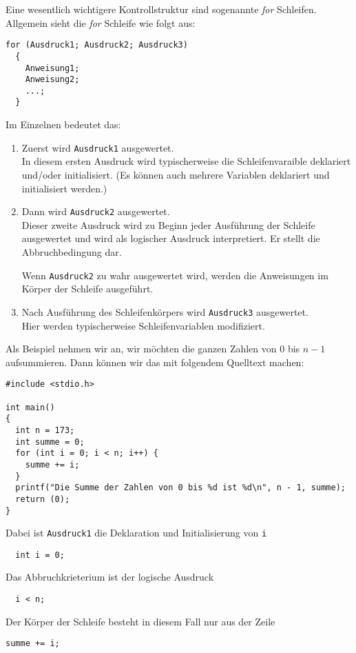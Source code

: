 Eine wesentlich wichtigere Kontrollstruktur sind sogenannte \emph{for} Schleifen.
Allgemein sieht die \emph{for} Schleife wie folgt aus:
\begin{lstlisting}[caption={for Schleife}, belowcaptionskip=0.3em]
for (Ausdruck1; Ausdruck2; Ausdruck3)
  {
    Anweisung1;
    Anweisung2;
    ...;
  }
\end{lstlisting}
Im Einzelnen bedeutet das:
\begin{enumerate}
\item Zuerst wird \texttt{Ausdruck1} ausgewertet.\\
  In diesem ersten Ausdruck wird typischerweise die Schleifenvaraible deklariert und/oder initialisiert.
  (Es können auch mehrere Variablen deklariert und initialisiert werden.)
\item Dann wird \texttt{Ausdruck2} ausgewertet.\\
  Dieser zweite Ausdruck wird zu Beginn jeder Ausführung der Schleife ausgewertet und wird als logischer Ausdruck interpretiert.
  Er stellt die Abbruchbedingung dar.

  Wenn \texttt{Ausdruck2} zu wahr ausgewertet wird, werden die Anweisungen im Körper der Schleife ausgeführt. 
\item Nach Ausführung des Schleifenkörpers wird \texttt{Ausdruck3} ausgewertet.\\
  Hier werden typischerweise Schleifenvariablen modifiziert.
\end{enumerate}
Als Beispiel nehmen wir an, wir möchten die ganzen Zahlen von $0$ bis $n-1$ aufsummieren.
Dann können wir das mit folgendem Quelltext machen:
\begin{lstlisting}
#include <stdio.h>

int main()
{
  int n = 173;
  int summe = 0;
  for (int i = 0; i < n; i++) {
    summe += i;
  }
  printf("Die Summe der Zahlen von 0 bis %d ist %d\n", n - 1, summe);
  return (0);
}
\end{lstlisting}
Dabei ist \texttt{Ausdruck1} die Deklaration und Initialisierung von \verb|i|
\begin{lstlisting}
  int i = 0;
\end{lstlisting}
Das Abbruchkrieterium ist der logische Ausdruck
\begin{lstlisting}
  i < n;
\end{lstlisting}
Der Körper der Schleife besteht in diesem Fall nur aus der Zeile
\begin{lstlisting}
summe += i;
\end{lstlisting}

